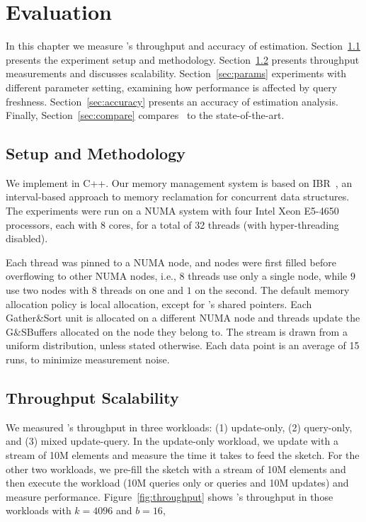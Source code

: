 \chapter{Evaluation}
\label{chap:eval}

In this chapter we measure \mysketch's throughput and accuracy of estimation. 
Section~\ref{sec:setup} presents the experiment setup and methodology.
Section~\ref{sec:tput} presents throughput measurements and discusses scalability.
Section~\ref{sec:params} experiments with different parameter setting, examining how performance is affected by query freshness. 
Section~\ref{sec:accuracy} presents an accuracy of estimation analysis.
Finally, Section~\ref{sec:compare} compares \mysketch\ to the state-of-the-art. 

\section{Setup and Methodology}
\label{sec:setup}
We implement \mysketch in C++. Our memory management system is based on IBR~\cite{Haosen_2018_IBR}, an interval-based approach to memory reclamation for concurrent data structures. 
The experiments were run on a NUMA system with four Intel Xeon E5-4650 processors, each with 8 cores, for a total of 32 threads (with hyper-threading disabled).


Each thread was pinned to a NUMA node, and nodes were first filled before overflowing to other NUMA nodes, i.e., $8$ threads use only a single node, while $9$ use two nodes with $8$ threads on one and $1$ on the second. The default memory allocation policy is local allocation, except for \mysketch's shared pointers. Each Gather\&Sort unit is allocated on a different NUMA node and threads update the G\&SBuffers allocated on the node they belong to.
The stream is drawn from a uniform distribution, unless stated otherwise. Each data point is an average of 15 runs, to minimize measurement noise.

 
\section{Throughput Scalability}
\label{sec:tput} 
We measured \mysketch's throughput in three workloads:
(1) update-only, (2) query-only, and (3) mixed update-query. In the update-only workload, we update \mysketch with a stream of 10M elements and measure the time it takes to feed the sketch. For the other two workloads, we pre-fill the sketch with a stream of 10M elements and then execute the workload (10M queries only or queries and 10M updates) and measure performance. Figure~\ref{fig:throughput} shows \mysketch's throughput in those workloads with $k = 4096$ and $b = 16$,


